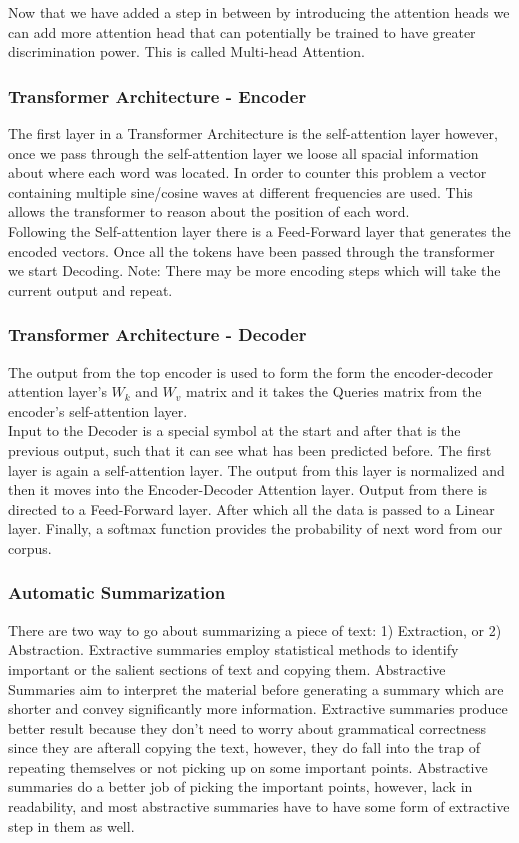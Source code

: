 \documentclass[12pt, a4paper]{article}
\begin{document}
Now that we have added a step in between by introducing the attention heads we can add more attention head that can potentially be trained to have greater discrimination power. This is called Multi-head Attention.

\subsubsection*{Transformer Architecture - Encoder}
The first layer in a Transformer Architecture is the self-attention layer however, once we pass through the self-attention layer we loose all spacial information about where each word was located. In order to counter this problem a vector containing multiple sine/cosine waves at different frequencies are used. This allows the transformer to reason about the position of each word. \\
Following the Self-attention layer there is a Feed-Forward layer that generates the encoded vectors. Once all the tokens have been passed through the transformer we start Decoding. Note: There may be more encoding steps which will take the current output and repeat. 

\subsubsection*{Transformer Architecture - Decoder} 
The output from the top encoder is used to form the form the encoder-decoder attention layer's \(W_k\)  \textrm{and}  \(W_v\) matrix and it takes the Queries matrix from the encoder's self-attention layer. \\
Input to the Decoder is a special symbol at the start and after that is the previous output, such that it can see what has been predicted before. The first layer is again a self-attention layer. The output from this layer is normalized and then it moves into the Encoder-Decoder Attention layer. Output from there is directed to a Feed-Forward layer. After which all the data is passed to a Linear layer. Finally, a softmax function provides the probability of next word from our corpus.

\subsubsection*{Automatic Summarization}
There are two way to go about summarizing a piece of text: 1) Extraction, or 2) Abstraction. Extractive summaries employ statistical methods to identify important or the salient sections of text and copying them. Abstractive Summaries aim to interpret the material before generating a summary which are shorter and convey significantly more information. Extractive summaries produce better result because they don't need to worry about grammatical correctness since they are afterall copying the text, however, they do fall into the trap of repeating themselves or not picking up on some important points. Abstractive summaries do a better job of picking the important points, however, lack in readability, and most abstractive summaries have to have some form of extractive step in them as well.   
\end{document}
